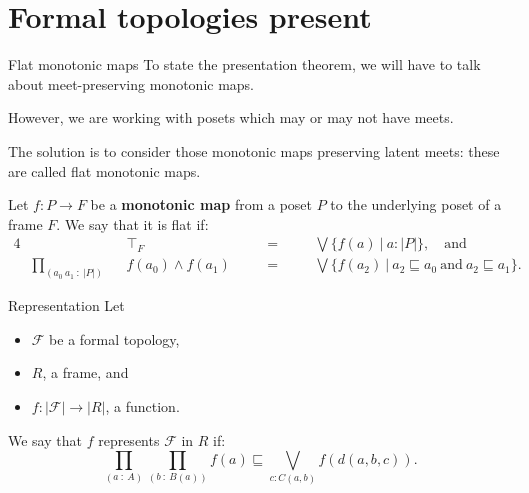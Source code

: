 \documentclass[xcolor={dvipsnames}]{beamer}
\newcommand{\pity}[3]{\prod_{(#1~:~#2)} #3}
\newcommand{\abs}[1]{\left| #1 \right|}
\newcommand{\McF}{\mathcal{F}}
\begin{document}
\section{Formal topologies present}

\begin{frame}{Flat monotonic maps}
  To state the presentation theorem, we will have to talk about meet-preserving monotonic
  maps.

  \vspace{0.5em}

  However, we are working with posets which may or may not have meets.

  \vspace{0.5em}

  The solution is to consider those monotonic maps preserving \alert{latent meets}: these
  are called \alert{flat monotonic maps}.

  \vspace{0.5em}

  Let $f : P \rightarrow F$ be a \textbf{monotonic map} from a poset $P$ to the underlying poset of
  a frame $F$. We say that it is \alert{flat} if:
  \begin{alignat*}{4}
    & &&\top_F &&\quad=\quad &&\bigvee \{ f(a) ~|~ a : \abs{P} \},\quad\text{and}\\
    &\pity{a_0~a_1}{\abs{P}}{&&f(a_0) \wedge f(a_1) &&\quad=\quad &&\bigvee \{ f(a_2) ~|~ a_2 \sqsubseteq a_0 ~\text{and}~ a_2 \sqsubseteq a_1 \} }.
  \end{alignat*}
\end{frame}

\begin{frame}{Representation}
  Let
  \begin{itemize}
    \item $\McF{}$ be a formal topology,
    \item $R$, a frame, and
    \item $f : \abs{\McF{}} \rightarrow \abs{R}$, a function.
  \end{itemize}
  

  \vspace{1em}

  We say that $f$ \alert{represents} $\McF{}$ in $R$ if:
  \begin{equation*}
    \pity{a}{A}{\pity{b}{B(a)}{f(a) \sqsubseteq \bigvee_{c : C(a, b)} f(d(a, b, c))}}.
  \end{equation*}
\end{frame}
\end{document}
